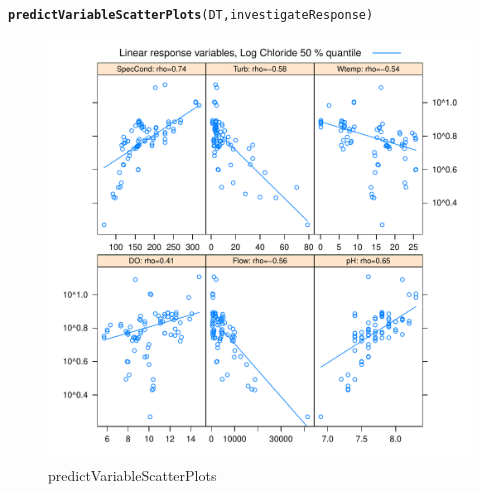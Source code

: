 \documentclass[a4paper,11pt]{article}\usepackage[]{graphicx}\usepackage[]{color}
\makeatletter
\def\maxwidth{ %
  \ifdim\Gin@nat@width>\linewidth
    \linewidth
  \else
    \Gin@nat@width
  \fi
}
\newcommand{\hlstd}[1]{\textcolor[rgb]{0.345,0.345,0.345}{#1}}%
\newcommand{\hlkwd}[1]{\textcolor[rgb]{0.737,0.353,0.396}{\textbf{#1}}}%
\newenvironment{kframe}{%
 \def\at@end@of@kframe{}%
 \ifinner\ifhmode%
  \def\at@end@of@kframe{\end{minipage}}%
  \begin{minipage}{\columnwidth}%
 \fi\fi%
 \def\FrameCommand##1{\hskip\@totalleftmargin \hskip-\fboxsep
 \colorbox{shadecolor}{##1}\hskip-\fboxsep
     \hskip-\linewidth \hskip-\@totalleftmargin \hskip\columnwidth}%
 \MakeFramed {\advance\hsize-\width
   \@totalleftmargin\z@ \linewidth\hsize
   \@setminipage}}%
 {\par\unskip\endMakeFramed%
 \at@end@of@kframe}
\newenvironment{knitrout}{}{} %
\makeatother
\begin{document}
\begin{knitrout}
\color{fgcolor}\begin{kframe}
\begin{alltt}
\hlkwd{predictVariableScatterPlots}\hlstd{(DT,investigateResponse)}
\end{alltt}
\end{kframe}\begin{figure}[]

\includegraphics[width=\maxwidth]{figure/predictVariableScatterPlots1} \caption[predictVariableScatterPlots]{predictVariableScatterPlots\label{fig:predictVariableScatterPlots1}}
\end{figure}

\begin{figure}[]


\end{figure}
\end{knitrout}
\end{document}
